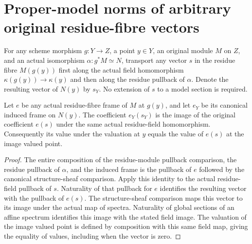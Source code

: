 \section{Proper-model norms of arbitrary original residue-fibre vectors}

\begin{definition}
\label{def:original-residue-vector-transport}
\leanok
For any scheme morphism $g:Y\to Z$, a point $y\in Y$, an original
module $M$ on $Z$, and an actual isomorphism $\alpha:g^*M\simeq N$,
transport any vector $s$ in the residue fibre $M(g(y))$ first along
the actual field homomorphism $\kappa(g(y))\to\kappa(y)$ and then
along the residue pullback of $\alpha$. Denote the resulting vector
of $N(y)$ by $s_Y$. No extension of $s$ to a model section is required.
\end{definition}

\begin{lemma}
\label{lem:original-residue-vector-frame-coefficient}
\leanok
Let $e$ be any actual residue-fibre frame of $M$ at $g(y)$, and let
$e_Y$ be its canonical induced frame on $N(y)$. The coefficient
$e_Y(s_Y)$ is the image of the original coefficient $e(s)$ under
the same actual residue-field homomorphism. Consequently its value
under the valuation at $y$ equals the value of $e(s)$ at the image
valued point.
\end{lemma}
\begin{proof}
The entire composition of the residue-module pullback comparison,
the residue pullback of $\alpha$, and the induced frame is the
pullback of $e$ followed by the canonical structure-sheaf comparison.
Apply this identity to the actual residue-field pullback of $s$.
Naturality of that pullback for $e$ identifies the resulting vector
with the pullback of $e(s)$. The structure-sheaf comparison maps
this vector to its image under the actual map of spectra. Naturality
of global sections of an affine spectrum identifies this image with
the stated field image. The valuation of the image valued point is
defined by composition with this same field map, giving the equality
of values, including when the vector is zero.
\end{proof}


